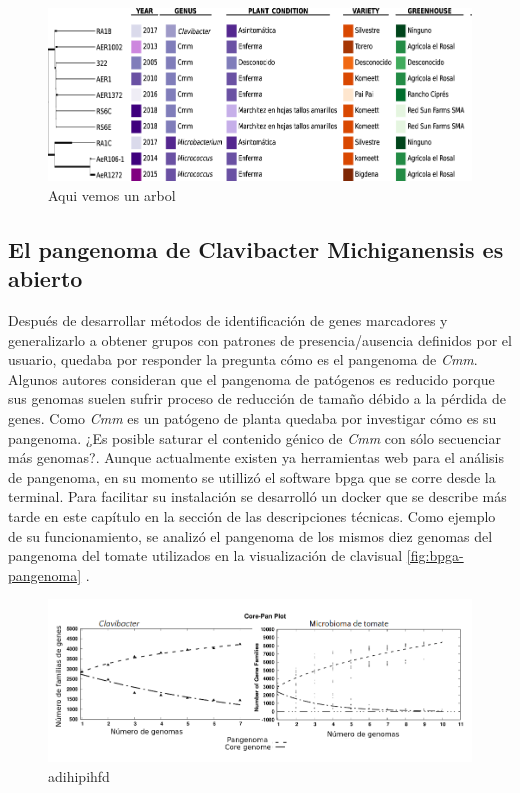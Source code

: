 \documentclass[12pt,twoside]{reedthesis}
\begin{document}
  \begin{figure}[h!tbp]
  \centering
  \includegraphics[angle = 0,scale = .4]{chapter1/Clavisual.png}
  \caption[ X X XXXX]{\footnotesize{Aqui vemos un arbol}}
  \label{fig:Clavisual}
  \end{figure}
  
  \subsection{El pangenoma de Clavibacter Michiganensis es
  abierto}\label{el-pangenoma-de-clavibacter-michiganensis-es-abierto}
  
  Después de desarrollar métodos de identificación de genes marcadores y
  generalizarlo a obtener grupos con patrones de presencia/ausencia
  definidos por el usuario, quedaba por responder la pregunta cómo es el
  pangenoma de \emph{Cmm}. Algunos autores consideran que el pangenoma de
  patógenos es reducido porque sus genomas suelen sufrir proceso de
  reducción de tamaño débido a la pérdida de genes. Como \emph{Cmm} es un
  patógeno de planta quedaba por investigar cómo es su pangenoma. ¿Es
  posible saturar el contenido génico de \emph{Cmm} con sólo secuenciar
  más genomas?. Aunque actualmente existen ya herramientas web para el
  análisis de pangenoma, en su momento se utillizó el software bpga que se
  corre desde la terminal. Para facilitar su instalación se desarrolló un
  docker que se describe más tarde en este capítulo en la sección de las
  descripciones técnicas. Como ejemplo de su funcionamiento, se analizó el
  pangenoma de los mismos diez genomas del pangenoma del tomate utilizados
  en la visualización de clavisual \autoref{fig:bpga-pangenoma} .
  
  \begin{figure}[h!tbp]
  \centering
  \includegraphics[angle = 0,scale = .5]{chapter1/bpga-pangenoma.png}
  \caption[ X X]{\footnotesize{adihipihfd }}
  \label{fig:bpga-pangenoma}
  \end{figure}
  
\end{document}
